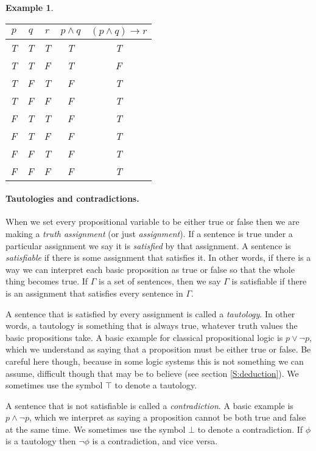 \documentclass{article}
\theoremstyle{plain}
\newtheorem{example}[theorem]{Example}{\bfseries}{\upshape}
\begin{document}
\begin{example}    
\begin{tabular}{ c c c c c }
 $p$ & $q$ & $r$ & $p\wedge q$ & $(p\wedge q)\rightarrow r$ \\ \hline 
 T & T & T & T & T \\  
 T & T & F & T & F \\
 T & F & T & F & T \\
 T & F & F & F & T \\
 F & T & T & F & T \\
 F & T & F & F & T \\
 F & F & T & F & T \\
 F & F & F & F & T 
\end{tabular} 
\end{example}

\paragraph{Tautologies and contradictions.}
When we set every propositional variable to be either true or false then we are making a \emph{truth assignment} (or just \emph{assignment}). If a sentence is true under a particular assignment we say it is \emph{satisfied} by that assignment. A sentence is \emph{satisfiable} if there is some assignment that satisfies it. In other words, if there is a way we can interpret each basic proposition as true or false so that the whole thing becomes true. If $\Gamma$ is a set of sentences, then we say $\Gamma$ is satisfiable if there is an assignment that satisfies every sentence in $\Gamma$. 

A sentence that is satisfied by every assignment is called a \emph{tautology}. In other words, a tautology is something that is always true, whatever truth values the basic propositions take. A basic example for classical propositional logic is $p\vee \neg p$, which we understand as saying that a proposition must be either true or false. Be careful here though, because in some logic systems this is not something we can assume, difficult though that may be to believe (see section \ref{S:deduction}).  We sometimes use the symbol $\top$ to denote a tautology. 

A sentence that is not satisfiable is called a \emph{contradiction}. A basic example is $p\wedge \neg p$, which we interpret as saying a proposition cannot be both true and false at the same time. We sometimes use the symbol $\bot$ to denote a contradiction. If $\phi$ is a tautology then $\neg \phi$ is a contradiction, and vice versa.
\end{document}
